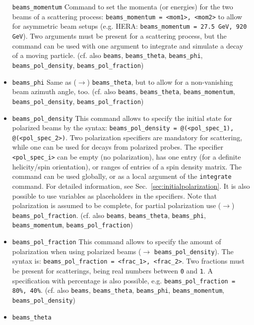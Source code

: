 \documentclass[12pt]{book}
\newcommand{\ttt}[1]{\texttt{#1}}
\begin{document}
\begin{itemize}
\ttt{beams\_momentum} \newline
Command to set the momenta (or energies) for the two beams of a
scattering process: \ttt{beams\_momentum = <mom1>, <mom2>} to allow 
for asymmetric beam setups (e.g. HERA: \ttt{beams\_momentum = 27.5
  GeV, 920 GeV}). Two arguments must be present 
for a scattering process, but the command can be used with one
argument to integrate and simulate a decay of a moving
particle. (cf. also \ttt{beams}, \ttt{beams\_theta},
\ttt{beams\_phi}, \ttt{beams\_pol\_density},
\ttt{beams\_pol\_fraction})
\item
\ttt{beams\_phi} \newline
Same as ($\to$) \ttt{beams\_theta}, but to allow for a non-vanishing
beam azimuth angle, too. (cf. also \ttt{beams}, \ttt{beams\_theta},
\ttt{beams\_momentum}, \ttt{beams\_pol\_density},
\ttt{beams\_pol\_fraction})
\item
\ttt{beams\_pol\_density} \newline
This command allows to specify the initial state for polarized beams
by the syntax: \ttt{beams\_pol\_density = @(<pol\_spec\_1),
  @(<pol\_spec\_2>)}. Two polarization specifiers are mandatory for
scattering, while one can be used for decays from polarized
probes. The specifier \ttt{<pol\_spec\_i>} can be empty (no
polarization), has one entry (for a definite helicity/spin
orientation), or ranges of entries of a spin density matrix. The
command can be used globally, or as a local argument of the
\ttt{integrate} command. For detailed information, see
Sec.~\ref{sec:initialpolarization}. It is also possible to use
variables as placeholders in the specifiers. Note that polarization is
assumed to be complete, for partial polarization use ($\to$)
\ttt{beams\_pol\_fraction}. (cf. also \ttt{beams}, \ttt{beams\_theta},
\ttt{beams\_phi}, \ttt{beams\_momentum}, \ttt{beams\_pol\_fraction})
\item
\ttt{beams\_pol\_fraction} \newline
This command allows to specify the amount of polarization when using
polarized beams ($\to$ \ttt{beams\_pol\_density}). The syntax is:
\ttt{beams\_pol\_fraction = <frac\_1>, <frac\_2>}. Two fractions must
be present for scatterings, being real numbers between \ttt{0} and
\ttt{1}. A specification with percentage is also possible,
e.g. \ttt{beams\_pol\_fraction = 80\%, 40\%}. (cf. also \ttt{beams},
\ttt{beams\_theta}, \ttt{beams\_phi}, \ttt{beams\_momentum},
\ttt{beams\_pol\_density})
\item
\ttt{beams\_theta} \newline

\end{itemize}
\end{document}
